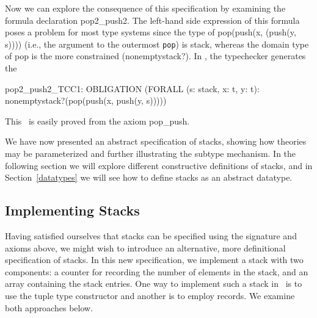 Now we can explore the consequence of this specification by examining
the formula declaration {\stt pop2\_push2}.  The left-hand side
expression of this formula poses a problem for most type systems since
the type of {\stt pop(push(x, (push(y, s))))} (i.e., the argument to
the outermost {\tt pop}) is {\stt stack}, whereas the domain type of
{\stt pop} is the more constrained {\stt (nonemptystack?)}.  In \pvs,
the typechecker generates the \tcc\
\begin{pvsexample}
  pop2_push2_TCC1: OBLIGATION
    (FORALL (s: stack, x: t, y: t):
       nonemptystack?(pop(push(x, push(y, s)))))
\end{pvsexample}
This \tcc\ is easily proved from the axiom {\stt pop\_push}.

We have now presented an abstract specification of stacks, showing how
theories may be parameterized and further illustrating the subtype
mechanism.  In the following section we will explore different
constructive definitions of stacks, and in Section~\ref{datatypes} we
will see how to define stacks as an abstract datatype.


\subsection{Implementing Stacks}

Having satisfied ourselves that stacks can be specified using the
signature and axioms above, we might wish to introduce an alternative,
more definitional specification of stacks.  In this new specification,
we implement a stack with two components: a counter for recording the
number of elements in the stack, and an array containing the stack
entries.  One way to implement such a stack in \pvs\ is to use the tuple
type constructor and another is to employ records.  We examine both
approaches below.

